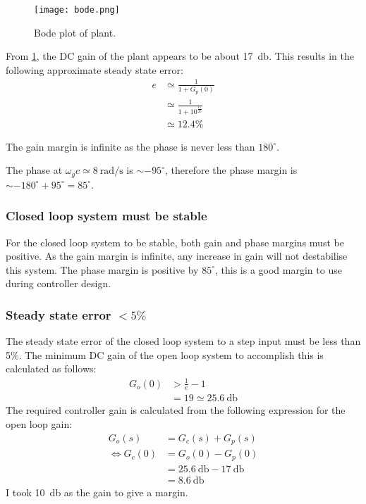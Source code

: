 \problem

\begin{figure}
	\centering
	\texttt{[image: bode.png]}
	\caption{Bode plot of plant.}
	\label{fig:p1:bode}
\end{figure}


From \cref{fig:p1:bode}, the DC gain of the plant appears to be about \SI{17}{\decibel}. This results in the following approximate steady state error:
\begin{align*}
	e &\simeq \frac{1}{1+G_p(0)}\\
	&\simeq \frac{1}{1+10^\frac{17}{20}}\\
	&\simeq 12.4\%
\end{align*}


The gain margin is infinite as the phase is never less than $180^\circ$.

The phase at $\omega_gc\simeq\SI{8}{\radian\per\second}$ is $\sim -95^\circ$, therefore the phase margin is $\sim -180^\circ +95^\circ=85^\circ$.\\


\subsubsection*{Closed loop system must be stable}

For the closed loop system to be stable, both gain and phase margins must be positive. As the gain margin is infinite, any increase in gain will not destabilise this system. The phase margin is positive by $85^\circ$, this is a good margin to use during controller design.

\subsubsection*{Steady state error $<5\%$}
The steady state error of the closed loop system to a step input must be less than 5\%. The minimum DC gain of the open loop system to accomplish this is calculated as follows:
\begin{align*}
	G_o(0) &> \frac{1}{e} -1 \\
	&= 19 \simeq \SI{25.6}{\decibel}
\end{align*}
The required controller gain is calculated from the following expression for the open loop gain:
\begin{align*}
	G_o(s) &= G_c(s) + G_p(s)\\
	\iff G_c(0) &= G_o(0) - G_p(0)\\
	&=\SI{25.6}{\decibel} - \SI{17}{\decibel}\\
	&= \SI{8.6}{\decibel}
\end{align*}
I took \SI{10}{\decibel} as the gain to give a margin.

